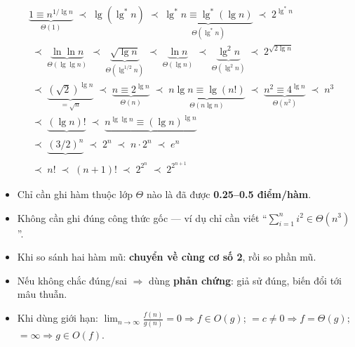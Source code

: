 ﻿\documentclass[12pt,a4paper]{article}
\begin{document}
\begin{resultbox}
\small
\[
\begin{aligned}
  & \underbrace{1 \equiv n^{1/\lg n}}_{\Theta(1)}
    \;\prec\; \lg(\lg^* n)
    \;\prec\; \underbrace{\lg^* n \equiv \lg^*(\lg n)}_{\Theta(\lg^* n)}
    \;\prec\; 2^{\lg^* n} \\[6pt]
  & \;\prec\; \underbrace{\ln\ln n}_{\Theta(\lg\lg n)}
    \;\prec\; \underbrace{\sqrt{\lg n}}_{\Theta(\lg^{1/2} n)}
    \;\prec\; \underbrace{\ln n}_{\Theta(\lg n)}
    \;\prec\; \underbrace{\lg^2 n}_{\Theta(\lg^2 n)}
    \;\prec\; 2^{\sqrt{2\lg n}} \\[6pt]
  & \;\prec\; \underbrace{(\sqrt{2})^{\lg n}}_{= \sqrt{n}}
    \;\prec\; \underbrace{n \equiv 2^{\lg n}}_{\Theta(n)}
    \;\prec\; \underbrace{n\lg n \equiv \lg(n!)}_{\Theta(n\lg n)}
    \;\prec\; \underbrace{n^2 \equiv 4^{\lg n}}_{\Theta(n^2)}
    \;\prec\; n^3 \\[6pt]
  & \;\prec\; \underbrace{(\lg n)!}_{} 
    \;\prec\; \underbrace{n^{\lg\lg n} \equiv (\lg n)^{\lg n}}_{} \\[6pt]
  & \;\prec\; \underbrace{(3/2)^n}_{}
    \;\prec\; 2^n
    \;\prec\; n \cdot 2^n
    \;\prec\; e^n \\[6pt]
  & \;\prec\; n!
    \;\prec\; (n+1)!
    \;\prec\; 2^{2^n}
    \;\prec\; 2^{2^{n+1}}
\end{aligned}
\]
\end{resultbox}

\bigskip

\begin{notebox}[title={Mẹo khi đi thi (theo cô Thương)}]
\begin{itemize}
  \item Chỉ cần ghi hàm thuộc lớp $\Theta$ nào là đã được \textbf{0.25--0.5 điểm/hàm}.
  \item Không cần ghi đúng công thức gốc --- ví dụ chỉ cần viết ``$\sum_{i=1}^{n} i^2 \in \Theta(n^3)$''.
  \item Khi so sánh hai hàm mũ: \textbf{chuyển về cùng cơ số 2}, rồi so phần mũ.
  \item Nếu không chắc đúng/sai $\Rightarrow$ dùng \textbf{phản chứng}: giả sử đúng, biến đổi tới mâu thuẫn.
  \item Khi dùng giới hạn: $\displaystyle\lim_{n\to\infty}\frac{f(n)}{g(n)} = 0 \Rightarrow f \in O(g)$; $= c \neq 0 \Rightarrow f = \Theta(g)$; $= \infty \Rightarrow g \in O(f)$.
\end{itemize}
\end{notebox}
\end{document}
